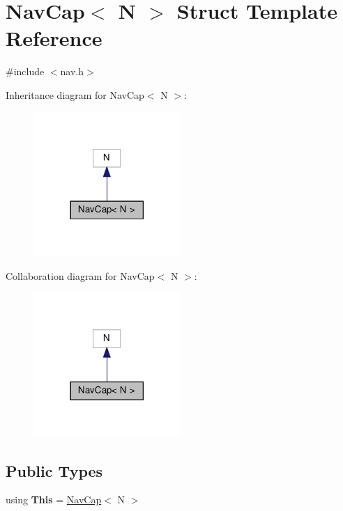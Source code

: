 \hypertarget{structNavCap}{}\section{Nav\+Cap$<$ N $>$ Struct Template Reference}
\label{structNavCap}


{\ttfamily \#include $<$nav.\+h$>$}



Inheritance diagram for Nav\+Cap$<$ N $>$\+:\nopagebreak
\begin{figure}[H]
\begin{center}
\leavevmode
\includegraphics[width=158pt]{structNavCap__inherit__graph}
\end{center}
\end{figure}


Collaboration diagram for Nav\+Cap$<$ N $>$\+:\nopagebreak
\begin{figure}[H]
\begin{center}
\leavevmode
\includegraphics[width=158pt]{structNavCap__coll__graph}
\end{center}
\end{figure}
\subsection*{Public Types}
\begin{DoxyCompactItemize}
\item 
\mbox{\label{structNavCap_a12a4346f544f4364330aabb7cca639d7}} 
using {\bfseries This} = \hyperlink{structNavCap}{Nav\+Cap}$<$ N $>$
\end{DoxyCompactItemize}
